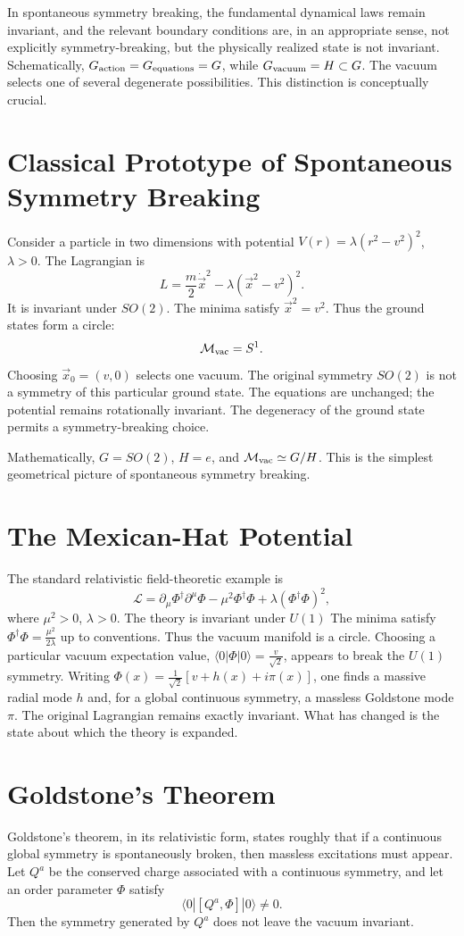 In spontaneous symmetry breaking, the fundamental dynamical laws remain
invariant, and the relevant boundary conditions are, in an appropriate sense,
not explicitly symmetry-breaking, but the physically realized state is not
invariant.
Schematically, $G_{\rm action}=G_{\rm equations}=G$, while
$G_{\rm vacuum}=H\subset G$.
The vacuum selects one of several degenerate possibilities.
This distinction is conceptually crucial.

\section{ Classical Prototype of Spontaneous Symmetry Breaking}
Consider a particle in two dimensions with potential
$V(r)=\lambda(r^2-v^2)^2$, $\lambda>0$.
The Lagrangian is
\[L= \frac{m}{2}\dot{\vec{x}}^2-\lambda(\vec{x}^2-v^2)^2.\]
It is invariant under $SO(2)$.
The minima satisfy $\vec{x}^2=v^2$.
Thus the ground states form a circle:
\[\mathcal{M}_{\rm vac}=S^1.\]
Choosing $\vec{x}_0=(v,0)$
selects one vacuum.
The original symmetry $SO(2)$ 
is not a symmetry of this particular ground state.
The equations are unchanged; the potential remains rotationally invariant.
The degeneracy of the ground state permits a symmetry-breaking choice.

Mathematically, $G=SO(2)$, $H={e}$, and $\mathcal{M}_{\rm vac}\simeq G/H$.
This is the simplest geometrical picture of spontaneous symmetry breaking.

\section{The Mexican-Hat Potential}
The standard relativistic field-theoretic example is
\[\mathcal{L}=\partial_\mu\Phi^\dagger\partial^\mu\Phi
-\mu^2\Phi^\dagger\Phi+\lambda(\Phi^\dagger\Phi)^2,\]
where $\mu^2>0$, $\lambda>0$.
The theory is invariant under $U(1)$
The minima satisfy $\Phi^\dagger\Phi=\tfrac{\mu^2}{2\lambda}$
up to conventions.
Thus the vacuum manifold is a circle.
Choosing a particular vacuum expectation value,
$\langle0|\Phi|0\rangle=\tfrac{v}{\sqrt2}$, appears to break the $U(1)$ 
symmetry. Writing $\Phi(x)=\tfrac{1}{\sqrt2}[v+h(x)+i\pi(x)]$,
one finds a massive radial mode $h$ and, for a global continuous symmetry, a
massless Goldstone mode $\pi$.
The original Lagrangian remains exactly invariant.  What has changed is the
state about which the theory is expanded.

\section{ Goldstone's Theorem}
Goldstone's theorem, in its relativistic form, states roughly that if a
continuous global symmetry is spontaneously broken, then massless excitations
must appear. Let $Q^a$ be the conserved charge associated with a continuous
symmetry, and let an order parameter $\Phi$ satisfy
\[\langle0|[Q^a,\Phi]|0\rangle\neq0.\]
Then the symmetry generated by $Q^a$ does not leave the vacuum invariant.

